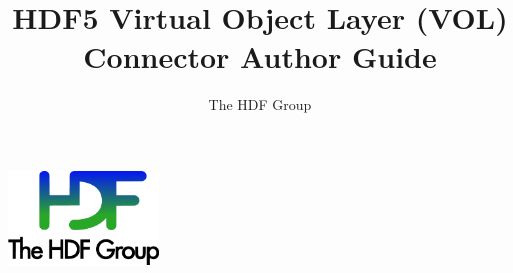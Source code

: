 \documentclass[10pt,a4paper]{article}
\title{HDF5 Virtual Object Layer (VOL)\\
    Connector Author Guide}
\author{The HDF Group}
\begin{document}
\maketitle
\thispagestyle{empty}

\vfill
\begin{center}
\includegraphics[width=4cm]{THG_LOGO.pdf} %
\end{center}
\vfill
\vfill

\newpage
{}
\tableofcontents
\newpage


\renewcommand\appendixtocname{Appendix}


\newpage









\end{document}
